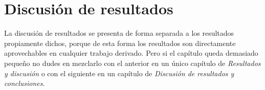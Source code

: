 \chapter{Discusión de resultados}
\label{ch:discusion-resultados}

La discusión de resultados se presenta de forma separada a los resultados propiamente dichos, porque de esta forma los resultados son directamente aprovechables en cualquier trabajo derivado.  Pero si el capítulo queda demasiado pequeño no dudes en mezclarlo con el anterior en un único capítulo de \emph{Resultados y discusión} o con el siguiente en un capítulo de \emph{Discusión de resultados y conclusiones}.




